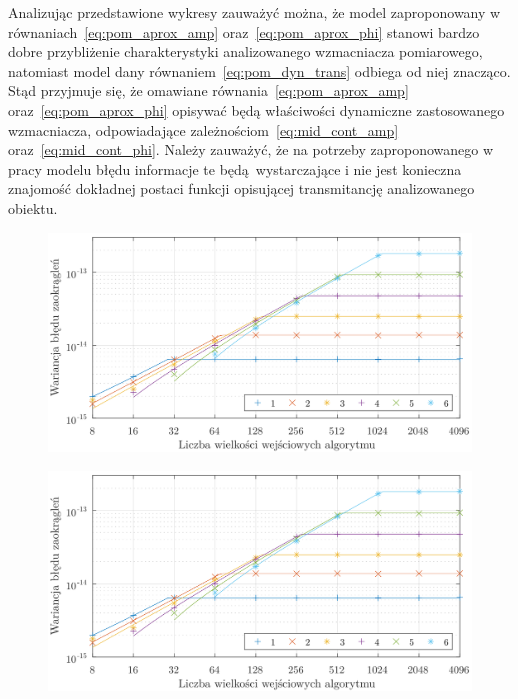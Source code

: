 Analizując przedstawione wykresy zauważyć można, że model zaproponowany w równaniach~\eqref{eq:pom_aprox_amp} oraz~\eqref{eq:pom_aprox_phi} stanowi bardzo dobre przybliżenie charakterystyki analizowanego wzmacniacza pomiarowego, natomiast model dany równaniem~\eqref{eq:pom_dyn_trans} odbiega od niej znacząco. Stąd przyjmuje się, że omawiane równania~\eqref{eq:pom_aprox_amp} oraz~\eqref{eq:pom_aprox_phi} opisywać będą właściwości dynamiczne zastosowanego wzmacniacza, odpowiadające zależnościom~\eqref{eq:mid_cont_amp} oraz~\eqref{eq:mid_cont_phi}. Należy zauważyć, że na potrzeby zaproponowanego w pracy modelu błędu informacje te będą wystarczające i nie jest konieczna znajomość dokładnej postaci funkcji opisującej transmitancję analizowanego obiektu.

\begin{figure}[htb!]
\begin{center}
\includegraphics{obrazki/dwt_rerror_coif5}
\end{center}
\end{figure}

\begin{figure}[htb!]
\begin{center}
\includegraphics{obrazki/dwt_rerror_coif5}
\end{center}
\end{figure}

